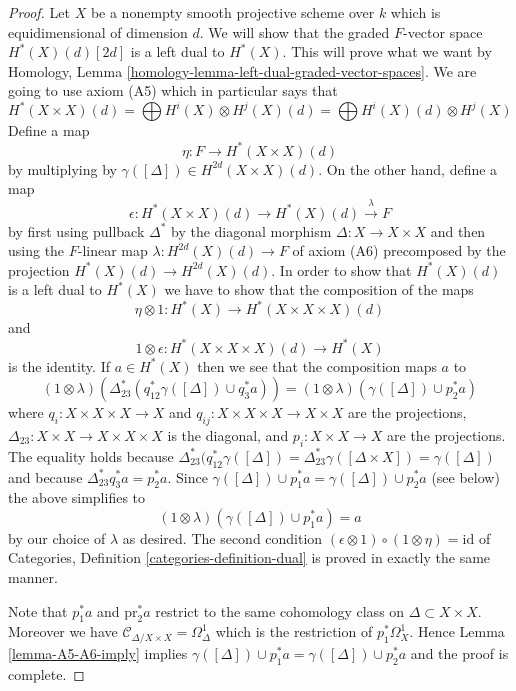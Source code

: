 \begin{proof}
Let $X$ be a nonempty smooth projective scheme over $k$ which is
equidimensional of dimension $d$. We will show that the graded $F$-vector space
$H^*(X)(d)[2d]$ is a left dual to $H^*(X)$. This will prove what we want by
Homology, Lemma \ref{homology-lemma-left-dual-graded-vector-spaces}. We are
going to use axiom (A5) which in particular says that
$$
H^*(X \times X)(d) =
\bigoplus H^i(X) \otimes H^j(X)(d) =
\bigoplus H^i(X)(d) \otimes H^j(X)
$$
Define a map
$$
\eta : F \longrightarrow H^*(X \times X)(d)
$$
by multiplying by $\gamma([\Delta]) \in H^{2d}(X \times X)(d)$.
On the other hand, define a map
$$
\epsilon :
H^*(X \times X)(d) \longrightarrow H^*(X)(d) \xrightarrow{\lambda} F
$$
by first using pullback $\Delta^*$ by the diagonal morphism
$\Delta : X \to X \times X$ and then using the $F$-linear map
$\lambda : H^{2d}(X)(d) \to F$ of axiom (A6) precomposed
by the projection $H^*(X)(d) \to H^{2d}(X)(d)$.
In order to show that $H^*(X)(d)$ is a left dual to $H^*(X)$
we have to show that the composition of the maps
$$
\eta \otimes 1 :
H^*(X) \longrightarrow H^*(X \times X \times X)(d)
$$
and
$$
1 \otimes \epsilon : H^*(X \times X \times X)(d) \longrightarrow H^*(X)
$$
is the identity. If $a \in H^*(X)$ then we see
that the composition maps $a$ to
$$
(1 \otimes \lambda)(\Delta_{23}^*(q_{12}^*\gamma([\Delta]) \cup q_3^*a)) =
(1 \otimes \lambda)(\gamma([\Delta]) \cup p_2^*a)
$$
where $q_i : X \times X \times X \to X$ and
$q_{ij} : X \times X \times X \to X \times X$ are the projections,
$\Delta_{23} : X \times X \to X \times X \times X$ is the diagonal, and
$p_i : X \times X \to X$ are the projections.
The equality holds because $\Delta_{23}^*(q_{12}^*\gamma([\Delta]) =
\Delta_{23}^*\gamma([\Delta \times X]) = \gamma([\Delta])$
and because $\Delta_{23}^* q_3^*a = p_2^*a$.
Since $\gamma([\Delta]) \cup p_1^*a = \gamma([\Delta]) \cup p_2^*a$
(see below) the above simplifies to
$$
(1 \otimes \lambda)(\gamma([\Delta]) \cup p_1^*a) = a
$$
by our choice of $\lambda$ as desired. The second condition
$(\epsilon \otimes 1) \circ (1 \otimes \eta) = \text{id}$
of Categories, Definition \ref{categories-definition-dual}
is proved in exactly the
same manner.

\medskip\noindent
Note that $p_1^*a$ and $\text{pr}_2^*a$ restrict to the same
cohomology class on $\Delta \subset X \times X$. Moreover we
have $\mathcal{C}_{\Delta/X \times X} = \Omega^1_\Delta$ which
is the restriction of $p_1^*\Omega^1_X$. Hence
Lemma \ref{lemma-A5-A6-imply} implies
$\gamma([\Delta]) \cup p_1^*a = \gamma([\Delta]) \cup p_2^*a$
and the proof is complete.
\end{proof}

